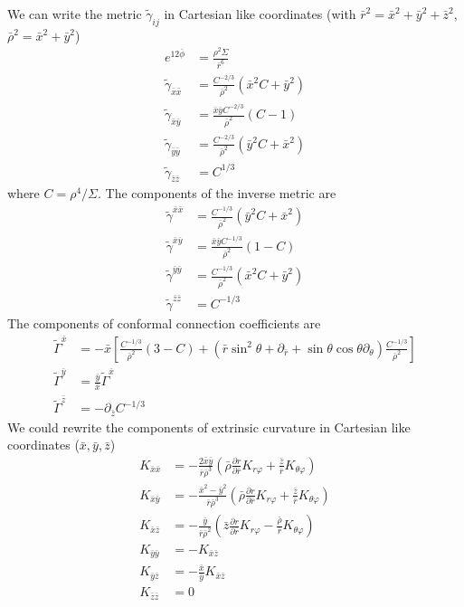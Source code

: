 \documentclass[%
 reprint,
 amsmath,amssymb,
 aps,
]{revtex4-1}
\begin{document}
We can write the metric $\tilde{\gamma}_{ij}$ in Cartesian like coordinates (with $\bar{r}^2 = \bar{x}^2+\bar{y}^2 + \bar{z}^2$, $\bar{\rho}^2= \bar{x}^2+\bar{y}^2$)
\begin{align}
e^{12 \bar{\phi}} &= \frac{\rho^2 \Sigma}{\bar{r}^6} \\
\tilde{\gamma}_{\bar{x} \bar{x}} &=\frac{C^{-2/3}}{\bar{\rho}^2} (\bar{x}^2 C + \bar{y}^2) \\
\tilde{\gamma}_{\bar{x} \bar{y}} &=\frac{\bar{x} \bar{y} C^{-2/3}}{\bar{\rho}^2} (C-1) \\
\tilde{\gamma}_{\bar{y} \bar{y}} &=\frac{C^{-2/3}}{\bar{\rho}^2} (\bar{y}^2 C + \bar{x}^2)\\
\tilde{\gamma}_{\bar{z} \bar{z}} &=C^{1/3}
\end{align}
where $C = \rho^4/\Sigma$. The components of the inverse metric are
\begin{align}
\tilde{\gamma}^{\bar{x} \bar{x}} &=\frac{C^{-1/3}}{\bar{\rho}^2} (\bar{y}^2 C + \bar{x}^2) \\
\tilde{\gamma}^{\bar{x} \bar{y}} &=\frac{\bar{x} \bar{y} C^{-1/3}}{\bar{\rho}^2} (1- C) \\
\tilde{\gamma}^{\bar{y} \bar{y}} &=\frac{C^{-1/3}}{\bar{\rho}^2} (\bar{x}^2 C + \bar{y}^2)\\
\tilde{\gamma}^{\bar{z} \bar{z}} &=C^{-1/3}
\end{align}
The components of conformal connection coefficients are
\begin{align}
\tilde{\Gamma}^{\bar{x}} &= -\bar{x} \left[\frac{C^{-1/3}}{\bar{\rho}^2}(3-C) + (\bar{r} \sin^2 \theta + \partial_{\bar{r}} + \sin \theta \cos \theta \partial_\theta)\frac{C^{-1/3}}{\bar{\rho}^2} \right] \\
\tilde{\Gamma}^{\bar{y}} &= \frac{\bar{y}}{\bar{x}} \tilde{\Gamma}^{\bar{x}} \\
\tilde{\Gamma}^{\bar{z}} &= - \partial_{\bar{z}} C^{-1/3}
\end{align}
We could rewrite the components of extrinsic curvature in Cartesian like coordinates ($\bar{x}, \bar{y}, \bar{z}$)
\begin{align}
K_{\bar{x} \bar{x}} &= - \frac{2 \bar{x} \bar{y}}{\bar{r} \bar{\rho}^3} \left(\bar{\rho} \frac{\partial r}{\partial \bar{r}} K_{r \varphi} + \frac{\bar{z}}{\bar{r}} K_{\theta \varphi} \right)\\
K_{\bar{x} \bar{y}} &= - \frac{\bar{x}^2 - \bar{y}^2}{\bar{r} \bar{\rho}^3} \left(\bar{\rho} \frac{\partial r}{\partial \bar{r}} K_{r \varphi} + \frac{\bar{z}}{\bar{r}} K_{\theta \varphi} \right)\\
K_{\bar{x} \bar{z}} &= - \frac{\bar{y}}{\bar{r} \bar{\rho}^2} \left(\bar{z} \frac{\partial r}{\partial \bar{r}} K_{r \varphi} -\frac{\bar{\rho}}{\bar{r}} K_{\theta \varphi} \right)\\
K_{\bar{y} \bar{y}} &= -K_{\bar{x} \bar{z}} \\
K_{\bar{y} \bar{z}} &= -\frac{\bar{x}}{\bar{y}} K_{\bar{x} \bar{z}} \\
K_{\bar{z} \bar{z}} &= 0
\end{align}
\end{document}
